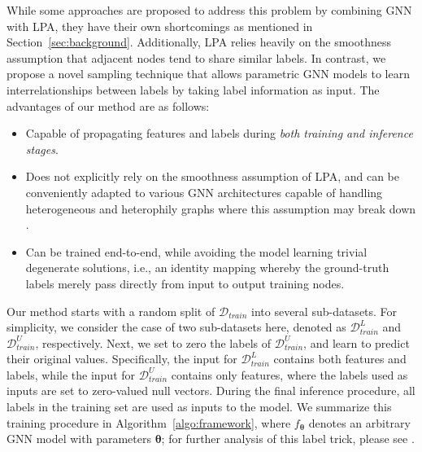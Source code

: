 \documentclass[sigconf,screen,nonacm]{acmart} \usepackage{booktabs}
\newcommand{\bs}{\boldsymbol}
\newcommand{\btheta}{\bs{\theta}}
\begin{document}
While some approaches are proposed to address this problem by combining GNN with LPA, they have their own shortcomings as mentioned in Section~\ref{sec:background}.
	Additionally, LPA relies heavily on the smoothness assumption that adjacent nodes tend to share similar labels.
In contrast, we propose a novel sampling technique that allows parametric GNN models to learn interrelationships between labels by taking label information as input. The advantages of our method are as follows:
	\begin{itemize}[topsep=3pt,leftmargin=10pt]
	\item Capable of propagating features and labels during \emph{both training and inference stages}.
	\item Does not explicitly rely on the smoothness assumption of LPA, and can be conveniently adapted to various GNN architectures capable of handling heterogeneous and heterophily graphs where this assumption may break down \citep{zhu2020beyond,busbridge2019relational,PeiWCLY20,schlichtkrull2018modeling,yang2021graph}.
	\item Can be trained end-to-end, while avoiding the model learning trivial degenerate solutions, i.e., an identity mapping whereby the ground-truth labels merely pass directly from input to output training nodes.
	\end{itemize}
	
	Our method starts with a random split of $\mathcal{D}_{train}$ into several sub-datasets.
	For simplicity, we consider the case of two sub-datasets here, denoted as $\mathcal{D}^L_{train}$ and $\mathcal{D}^U_{train}$, respectively.
	Next, we set to zero the labels of $\mathcal{D}^U_{train}$, and learn to predict their original values.
	Specifically, the input for $\mathcal{D}^L_{train}$ contains both features and labels, while the input for $\mathcal{D}^U_{train}$ contains only features, where the labels used as inputs are set to zero-valued null vectors.
	During the final inference procedure, all labels in the training set are used as inputs to the model.
	We summarize this training procedure in Algorithm~\ref{algo:framework}, where $f_{\btheta}$ denotes an arbitrary GNN model with parameters $\btheta$; for further analysis of this label trick, please see \cite{wang2021why}.
	
\end{document}
